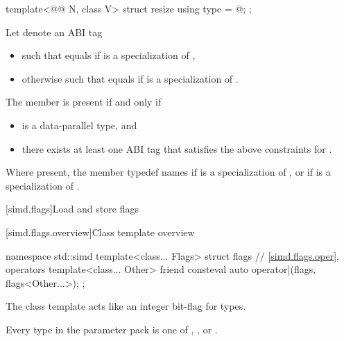 \begin{itemdecl}
template<@@ N, class V> struct resize { using type = @\seebelow@; };
\end{itemdecl}

\begin{itemdescr}
\pnum
Let  denote an ABI tag
\begin{itemize}
 \item
   such that 
   equals  if  is a specialization of ,
 \item
   otherwise such that
   equals  if  is a specialization of .
\end{itemize}

\pnum
The member  is present if and only if
\begin{itemize}
\item
   is a data-parallel type, and
\item
  there exists at least one ABI tag
  that satisfies the above constraints for .
\end{itemize}

\pnum
Where present, the member typedef  names
if  is a specialization of , or
if  is a specialization of .
\end{itemdescr}

[simd.flags]{Load and store flags}

[simd.flags.overview]{Class template  overview}

\begin{codeblock}
namespace std::simd {
  template<class... Flags> struct flags {
    // \ref{simd.flags.oper},  operators
    template<class... Other>
      friend consteval auto operator|(flags, flags<Other...>);
  };
}
\end{codeblock}

\pnum
\begin{note}
The class template  acts like an integer bit-flag for types.
\end{note}

\pnum
\constraints
Every type in the parameter pack  is one of ,
, or .

